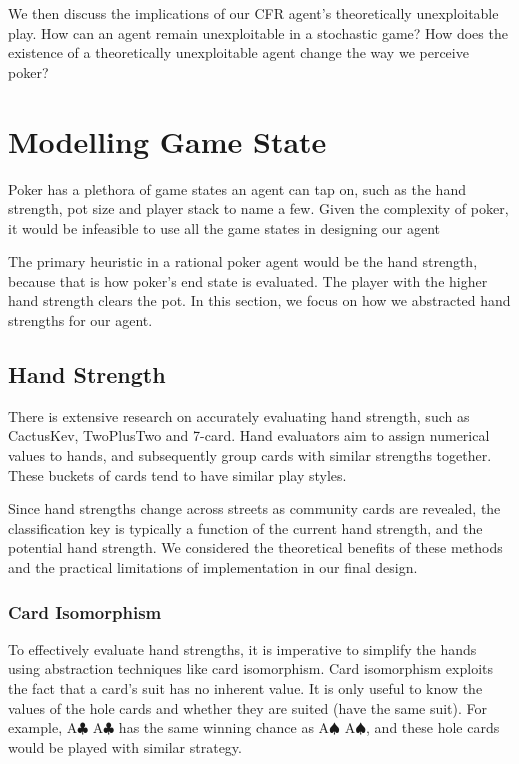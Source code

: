 \documentclass{article}
\begin{document}
We then discuss the implications of our CFR agent's theoretically unexploitable play. How can an agent remain unexploitable in a stochastic game? How does the existence of a theoretically unexploitable agent change the way we perceive poker?


\section{Modelling Game State}
Poker has a plethora of game states an agent can tap on, such as the hand strength, pot size and player stack to name a few. Given the complexity of poker, it would be infeasible to use all the game states in designing our agent

The primary heuristic in a rational poker agent would be the hand strength, because that is how poker's end state is evaluated. The player with the higher hand strength clears the pot. In this section, we focus on how we abstracted hand strengths for our agent.

\subsection{Hand Strength}
There is extensive research on accurately evaluating hand strength, such as CactusKev, TwoPlusTwo and 7-card. Hand evaluators aim to assign numerical values to hands, and subsequently group cards with similar strengths together. These buckets of cards tend to have similar play styles. 

Since hand strengths change across streets as community cards are revealed, the classification key is typically a function of the current hand strength, and the potential hand strength. We considered the theoretical benefits of these methods and the practical limitations of implementation in our final design.

\subsubsection{Card Isomorphism}
To effectively evaluate hand strengths, it is imperative to simplify the hands using abstraction techniques like card isomorphism. Card isomorphism exploits the fact that a card's suit has no inherent value. It is only useful to know the values of the hole cards and whether they are suited (have the same suit). For example, A$\clubsuit$ A$\clubsuit$ has the same winning chance as A$\spadesuit$ A$\spadesuit$, and these hole cards would be played with similar strategy.
\end{document}
